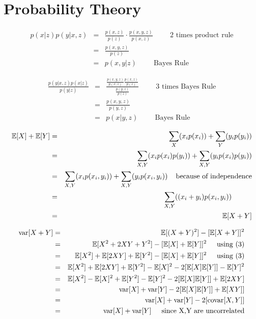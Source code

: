 \section*{Probability Theory}

\begin{eqnarray} 
    p(x|z)p(y|x,z) &=&  \frac{p(x,z)}{p(z)}\cdot \frac{p(x,y,z)}{p(x,z)} \hspace{1cm}\mbox{2 times product rule}\\
    &=&  \frac{p(x,y,z)}{p(z)} \\
    &=&  p(x,y|z) \hspace{1cm} \mbox{Bayes Rule}
\end{eqnarray}

\begin{eqnarray}
    \frac{p(y| x,z)p(x|z)}{p(y|z)}&=& \frac{\frac{p(x,y,z)}{p(x,z)} \frac{p(x,z)}{p(z)}}{\frac{p(y,z)}{p(z)}} \hspace{1cm}\mbox{3 times Bayes Rule}\\
    &=& \frac{p(x,y,z)}{p(y,z)} \\
    &=& p(x|y,z) \hspace{1cm}\mbox{Bayes Rule}
\end{eqnarray}


\begin{eqnarray}
    \mathbb{E}[X]+\mathbb{E}[Y]&=& \sum_{X}(x_i p(x_i)) + \sum_{Y}(y_i p(y_i))\\
    &=& \sum_{X, Y}(x_i p(x_i)p(y_i)) + \sum_{X,Y}(y_i p(x_i)p(y_i))\\
    &=& \sum_{X, Y}(x_i p(x_i,y_i)) + \sum_{X,Y}(y_i p(x_i,y_i)) \hspace{4mm}\mbox{because of independence}\\
    &=& \sum_{X, Y}((x_i+y_i) p(x_i,y_i))\hspace{1cm}\\
    &=& \mathbb{E}[X+Y]
\end{eqnarray}

\begin{eqnarray}
    \text{var}[X+Y]&=& \mathbb{E}[(X+Y)^2] - [\mathbb{E}[X+Y]]^2\\
    &=& \mathbb{E}[X^2+2XY+Y^2] - [\mathbb{E}[X]+\mathbb{E}[Y]]^2 \hspace{5mm}\mbox{using (3)}\\
    &=& \mathbb{E}[X^2]+\mathbb{E}[2XY]+\mathbb{E}[Y^2] - [\mathbb{E}[X]+\mathbb{E}[Y]]^2 \hspace{5mm}\mbox{using (3)}\\
    &=& \mathbb{E}[X^2]+\mathbb{E}[2XY]+\mathbb{E}[Y^2] - \mathbb{E}[X]^2-2[\mathbb{E}[X]\mathbb{E}[Y]] -\mathbb{E}[Y]^2 \\
    &=& \mathbb{E}[X^2]- \mathbb{E}[X]^2 +\mathbb{E}[Y^2]-\mathbb{E}[Y]^2 -2[\mathbb{E}[X]\mathbb{E}[Y]] +\mathbb{E}[2XY]  \\
    &=& \text{var}[X] +\text{var}[Y] -2[\mathbb{E}[X]\mathbb{E}[Y]] +\mathbb{E}[XY]]  \\
    &=& \text{var}[X] +\text{var}[Y] -2[\text{covar}[X,Y]]  \\
    &=& \text{var}[X] +\text{var}[Y]\hspace{5mm}\mbox{since X,Y are uncorrelated} 
\end{eqnarray}
